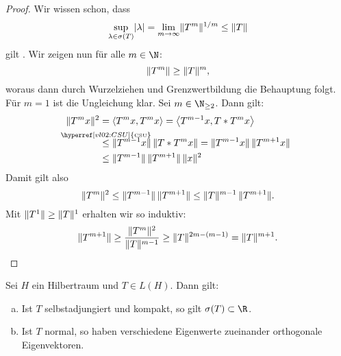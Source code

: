 \begin{proof}
    Wir wissen schon, dass
    \[ \sup_{\lambda\in\sigma(T)} \lvert\lambda\rvert 
        = \lim_{m\to\infty} \lVert T^m\rVert^{1/m} \leq \lVert T\rVert
    \]
    gilt .
    Wir zeigen nun für alle $m\in\N$:
    \[ \lVert T^m\rVert \geq \lVert T\rVert^m  , \]
    woraus dann durch Wurzelziehen und Grenzwertbildung die Behauptung folgt.
    Für $m=1$ ist die Ungleichung klar. Sei $m\in\N_{\geq2}$. Dann
    gilt:
    \begin{align*}
        \norm{T^mx}^2 
        &= \SP{T^mx,T^mx} = \SP{T^{m-1}x, T*T^m x}
        \\
        &\overset{\mathclap{\hyperref[vl02:CSU]{\text{\tiny CSU}}}}\leq
        \norm{T^{m-1}x} \, \norm{T*T^m x}
        = \norm{T^{m-1}x}\, \norm{T^{m+1}x}
        \\
        &\leq \norm{T^{m-1}} \, \norm{T^{m+1}} \, \norm{x}^2
    \end{align*}
    Damit gilt also
    \[ \lVert T^m\rVert^2 \leq \lVert T^{m-1}\rVert \, \lVert T^{m+1}\rVert
        \leq \lVert T\rVert^{m-1} \, \lVert T^{m+1}\rVert
    . \]
    Mit $\lVert T^1\rVert \geq \lVert T\rVert^1$ erhalten wir so induktiv:
    \[ \lVert T^{m+1}\rVert \geq \frac{\lVert T^m\rVert^2}{\lVert T\rVert^{m-1}}
        \geq \lVert T\rVert^{2m-(m-1)} = \lVert T\rVert^{m+1}
    . \]
\end{proof}

\pagebreak[2]
\begin{thSatz} \label{vl22:satz9.5}
    Sei $H$ ein Hilbertraum und $T\in L(H)$. Dann gilt:
    \begin{enumerate}[(a)]
        \item \label{vl22:satz9.5:a}
            Ist $T$ selbstadjungiert und kompakt, so gilt $\sigma(T)\subset\R$.
            
        \item \label{vl22:satz9.5:b}
            Ist $T$ normal, so haben verschiedene Eigenwerte zueinander
            orthogonale Eigenvektoren.
    \end{enumerate}
\end{thSatz}

